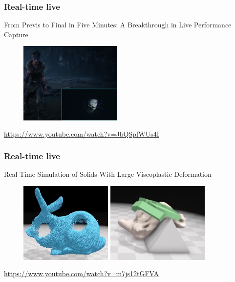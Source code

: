 \frame
{
  \frametitle{Real-time live}
From Previs to Final in Five Minutes: A Breakthrough in Live Performance Capture
  
  \begin{figure}
  	\centering
  	\includegraphics[height=4cm]{img/rtl.png}
  \end{figure}
  
  \centering
  \url{https://www.youtube.com/watch?v=JbQSpfWUs4I }
  

}
\frame
{
	\frametitle{Real-time live}
		
Real-Time Simulation of Solids With Large Viscoplastic Deformation\\
		  \begin{figure}
		  	\centering
		  	\includegraphics[height=4cm]{img/visco1.png}
		  	\includegraphics[height=4cm]{img/visco2.png}
		  \end{figure}
		  \centering
		  \url{https://www.youtube.com/watch?v=m7js12tGFVA}
}
